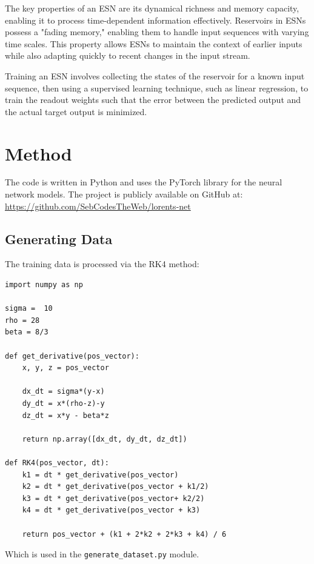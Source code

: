 \documentclass[11pt]{article}
\begin{document}
The key properties of an ESN are its dynamical richness and memory capacity, enabling it to process time-dependent information effectively. Reservoirs in ESNs possess a "fading memory," enabling them to handle input sequences with varying time scales. This property allows ESNs to maintain the context of earlier inputs while also adapting quickly to recent changes in the input stream.

Training an ESN involves collecting the states of the reservoir for a known input sequence, then using a supervised learning technique, such as linear regression, to train the readout weights such that the error between the predicted output and the actual target output is minimized.

\section{Method}
The code is written in Python and uses the PyTorch library for the neural network models. The project is publicly available on GitHub at: \url{https://github.com/SebCodesTheWeb/lorents-net}


\subsection{Generating Data}

The training data is processed via the RK4 method:

\begin{lstlisting}
import numpy as np

sigma =  10
rho = 28
beta = 8/3

def get_derivative(pos_vector):
    x, y, z = pos_vector

    dx_dt = sigma*(y-x)
    dy_dt = x*(rho-z)-y
    dz_dt = x*y - beta*z

    return np.array([dx_dt, dy_dt, dz_dt])

def RK4(pos_vector, dt):
    k1 = dt * get_derivative(pos_vector)
    k2 = dt * get_derivative(pos_vector + k1/2)
    k3 = dt * get_derivative(pos_vector+ k2/2)
    k4 = dt * get_derivative(pos_vector + k3)

    return pos_vector + (k1 + 2*k2 + 2*k3 + k4) / 6

\end{lstlisting}


Which is used in the \texttt{generate\_dataset.py} module.
\end{document}
